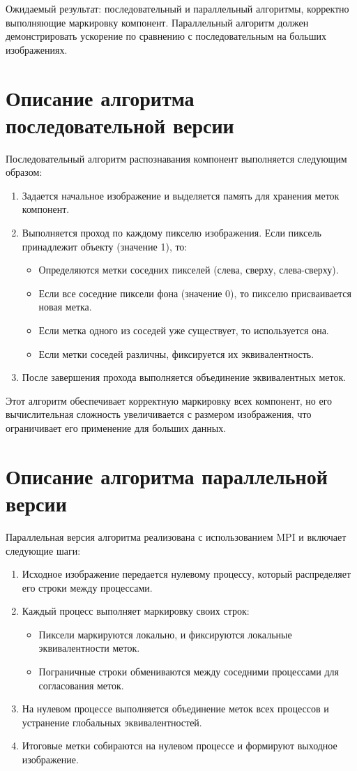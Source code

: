 \documentclass[a4paper,12pt]{article}
\begin{document}
Ожидаемый результат: последовательный и параллельный алгоритмы, корректно выполняющие маркировку компонент. Параллельный алгоритм должен демонстрировать ускорение по сравнению с последовательным на больших изображениях.

\newpage
\section*{Описание алгоритма последовательной версии}
Последовательный алгоритм распознавания компонент выполняется следующим образом:
\begin{enumerate}
\item Задается начальное изображение и выделяется память для хранения меток компонент.
\item Выполняется проход по каждому пикселю изображения. Если пиксель принадлежит объекту (значение 1), то:
\begin{itemize}
\item Определяются метки соседних пикселей (слева, сверху, слева-сверху).
\item Если все соседние пиксели фона (значение 0), то пикселю присваивается новая метка.
\item Если метка одного из соседей уже существует, то используется она.
\item Если метки соседей различны, фиксируется их эквивалентность.
\end{itemize}
\item После завершения прохода выполняется объединение эквивалентных меток.
\end{enumerate}

Этот алгоритм обеспечивает корректную маркировку всех компонент, но его вычислительная сложность увеличивается с размером изображения, что ограничивает его применение для больших данных.

\newpage
\section*{Описание алгоритма параллельной версии}
Параллельная версия алгоритма реализована с использованием MPI и включает следующие шаги:
\begin{enumerate}
\item Исходное изображение передается нулевому процессу, который распределяет его строки между процессами.
\item Каждый процесс выполняет маркировку своих строк:
\begin{itemize}
\item Пиксели маркируются локально, и фиксируются локальные эквивалентности меток.
\item Пограничные строки обмениваются между соседними процессами для согласования меток.
\end{itemize}
\item На нулевом процессе выполняется объединение меток всех процессов и устранение глобальных эквивалентностей.
\item Итоговые метки собираются на нулевом процессе и формируют выходное изображение.
\end{enumerate}
\end{document}
